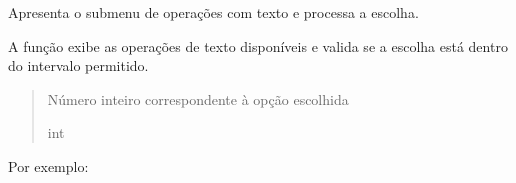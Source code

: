 \documentclass[letterpaper,10pt,portuges]{sphinxmanual}
\begin{document}
\begin{fulllineitems}
\label{\detokenize{main:main.menu_texto}}
\pysigstartsignatures
\pysiglinewithargsret
{}
{}
{}
\pysigstopsignatures
\sphinxAtStartPar
Apresenta o submenu de operações com texto e processa a escolha.

\sphinxAtStartPar
A função exibe as operações de texto disponíveis e valida se
a escolha está dentro do intervalo permitido.
\begin{quote}\begin{description}
\sphinxAtStartPar
Número inteiro correspondente à opção escolhida

\sphinxAtStartPar
int

\end{description}\end{quote}

\sphinxAtStartPar
Por exemplo:

\begin{sphinxVerbatim}[commandchars=\\\{\}]
\end{sphinxVerbatim}

\end{fulllineitems}

\end{document}
